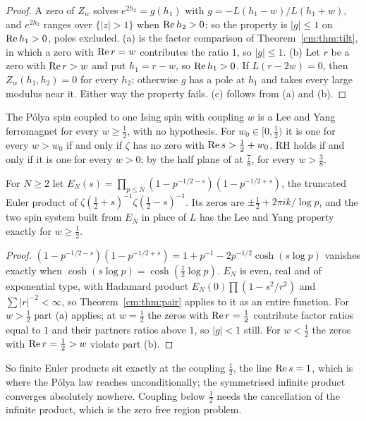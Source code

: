 \begin{proof}
A zero of $Z_w$ solves $e^{2h_2}=g(h_1)$ with $g=-L(h_1-w)/L(h_1+w)$, and $e^{2h_2}$ ranges over $\{|z|>1\}$ when $\operatorname{Re} h_2>0$; so the property is $|g|\le1$ on $\operatorname{Re} h_1>0$, poles excluded. (a) is the factor comparison of Theorem~\ref{cm:thm:tilt}, in which a zero with $\operatorname{Re} r=w$ contributes the ratio $1$, so $|g|\le1$. (b) Let $r$ be a zero with $\operatorname{Re} r>w$ and put $h_1=r-w$, so $\operatorname{Re} h_1>0$. If $L(r-2w)=0$, then $Z_w(h_1,h_2)=0$ for every $h_2$; otherwise $g$ has a pole at $h_1$ and takes every large modulus near it. Either way the property fails. (c) follows from (a) and (b).
\end{proof}

\begin{corollary}\label{cm:cor:pair}
The P\'olya spin coupled to one Ising spin with coupling $w$ is a Lee and Yang ferromagnet for every $w\ge\frac12$, with no hypothesis. For $w_0\in[0,\frac12)$ it is one for every $w>w_0$ if and only if $\zeta$ has no zero with $\operatorname{Re} s>\frac12+w_0$. RH holds if and only if it is one for every $w>0$; by the half plane of \cite{OAI26a} at $\frac78$, for every $w>\frac38$.
\end{corollary}

\begin{proposition}\label{cm:prop:euler}
For $N\ge2$ let $E_N(s)=\prod_{p\le N}(1-p^{-1/2-s})(1-p^{-1/2+s})$, the truncated Euler product of $\zeta(\frac12+s)^{-1}\zeta(\frac12-s)^{-1}$. Its zeros are $\pm\frac12+2\pi ik/\log p$, and the two spin system built from $E_N$ in place of $L$ has the Lee and Yang property exactly for $w\ge\frac12$.
\end{proposition}

\begin{proof}
$(1-p^{-1/2-s})(1-p^{-1/2+s})=1+p^{-1}-2p^{-1/2}\cosh(s\log p)$ vanishes exactly when $\cosh(s\log p)=\cosh(\frac12\log p)$. $E_N$ is even, real and of exponential type, with Hadamard product $E_N(0)\prod(1-s^2/r^2)$ and $\sum|r|^{-2}<\infty$, so Theorem~\ref{cm:thm:pair} applies to it as an entire function. For $w>\frac12$ part (a) applies; at $w=\frac12$ the zeros with $\operatorname{Re} r=\frac12$ contribute factor ratios equal to $1$ and their partners ratios above $1$, so $|g|<1$ still. For $w<\frac12$ the zeros with $\operatorname{Re} r=\frac12>w$ violate part (b).
\end{proof}

So finite Euler products sit exactly at the coupling $\frac12$, the line $\operatorname{Re} s=1$, which is where the P\'olya law reaches unconditionally; the symmetrised infinite product converges absolutely nowhere. Coupling below $\frac12$ needs the cancellation of the infinite product, which is the zero free region problem.

